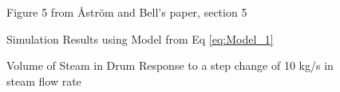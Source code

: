         \begin{figure}[ht]
            \begin{center}
                
                Figure 5 from \r{A}str\"{o}m and Bell's paper, section 5 \cite{Astrom}
                
                
                Simulation Results using Model from Eq \eqref{eq:Model_1}
                
                \caption{Volume of Steam in Drum Response to a step change of 10 kg/s in steam flow rate}
                \label{fig:Fig5B}
            \end{center}
        \end{figure}
